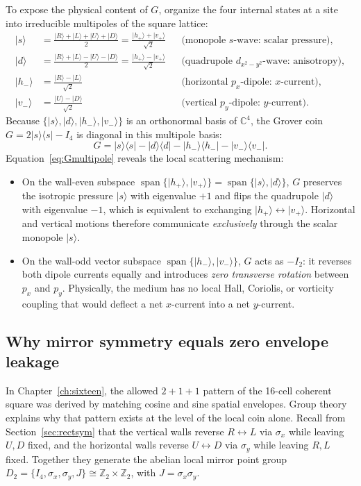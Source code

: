 \documentclass[11pt,a4paper,oneside]{report}
\newcommand{\ket}[1]{\lvert #1\rangle}
\newcommand{\bra}[1]{\langle #1\rvert}
\newcommand{\Id}{I}
\newcommand{\spanof}{\operatorname{span}}
\numberwithin{equation}{chapter}
\begin{document}
To expose the physical content of \(G\), organize the four internal states at
a site into irreducible multipoles of the square lattice:
\begin{align}
\ket s&=\frac{\ket R+\ket L+\ket U+\ket D}{2}
=\frac{\ket{h_+}+\ket{v_+}}{\sqrt2}
&&\text{(monopole }s\text{-wave: scalar pressure)},\\
\ket d&=\frac{\ket R+\ket L-\ket U-\ket D}{2}
=\frac{\ket{h_+}-\ket{v_+}}{\sqrt2}
&&\text{(quadrupole }d_{x^2-y^2}\text{-wave: anisotropy)},\\
\ket{h_-}&=\frac{\ket R-\ket L}{\sqrt2}
&&\text{(horizontal }p_x\text{-dipole: }x\text{-current)},\\
\ket{v_-}&=\frac{\ket U-\ket D}{\sqrt2}
&&\text{(vertical }p_y\text{-dipole: }y\text{-current)}.
\end{align}
Because \(\{\ket s,\ket d,\ket{h_-},\ket{v_-}\}\) is an orthonormal basis of
\(\mathbb C^4\), the Grover coin \(G=2\ket s\bra s-\Id_4\) is diagonal in
this multipole basis:
\begin{equation}
\boxed{
G=\ket s\bra s-\ket d\bra d-\ket{h_-}\bra{h_-}-\ket{v_-}\bra{v_-}.
}
\label{eq:Gmultipole}
\end{equation}
Equation~\eqref{eq:Gmultipole} reveals the local scattering mechanism:
\begin{itemize}
\item On the wall-even subspace \(\spanof\{\ket{h_+},\ket{v_+}\}
=\spanof\{\ket s,\ket d\}\), \(G\) preserves the isotropic pressure
\(\ket s\) with eigenvalue \(+1\) and flips the quadrupole \(\ket d\) with
eigenvalue \(-1\), which is equivalent to exchanging \(\ket{h_+}\leftrightarrow\ket{v_+}\).
Horizontal and vertical motions therefore communicate \emph{exclusively}
through the scalar monopole \(\ket s\).
\item On the wall-odd vector subspace \(\spanof\{\ket{h_-},\ket{v_-}\}\),
\(G\) acts as \(-\Id_2\): it reverses both dipole currents equally and
introduces \emph{zero transverse rotation} between \(p_x\) and \(p_y\).
Physically, the medium has no local Hall, Coriolis, or vorticity coupling
that would deflect a net \(x\)-current into a net \(y\)-current.
\end{itemize}

\subsection{Why mirror symmetry equals zero envelope leakage}

In Chapter~\ref{ch:sixteen}, the allowed \(2+1+1\) pattern of the 16-cell
coherent square was derived by matching cosine and sine spatial envelopes.
Group theory explains why that pattern exists at the level of the local
coin alone. Recall from Section~\ref{sec:rectsym} that the vertical walls
reverse \(R\leftrightarrow L\) via \(\sigma_x\) while leaving \(U,D\)
fixed, and the horizontal walls reverse \(U\leftrightarrow D\) via
\(\sigma_y\) while leaving \(R,L\) fixed. Together they generate the
abelian local mirror point group
\(D_2=\{\Id_4,\sigma_x,\sigma_y,J\}\cong\mathbb Z_2\times\mathbb Z_2\),
with \(J=\sigma_x\sigma_y\).
\end{document}
